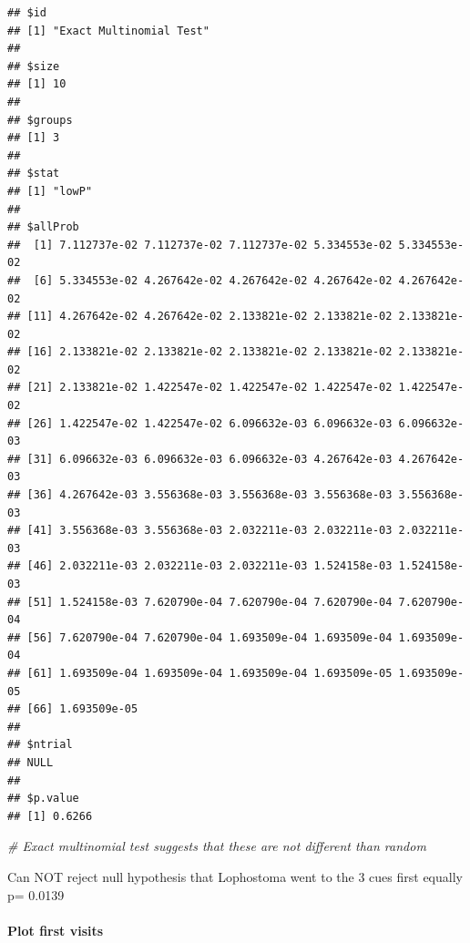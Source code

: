 \documentclass[]{article}
\newenvironment{Shaded}{\begin{snugshade}}{\end{snugshade}}
\newcommand{\CommentTok}[1]{\textcolor[rgb]{0.56,0.35,0.01}{\textit{{#1}}}}
\let\oldparagraph\paragraph
\renewcommand{\paragraph}[1]{\oldparagraph{#1}\mbox{}}
\begin{document}
\begin{verbatim}
## $id
## [1] "Exact Multinomial Test"
## 
## $size
## [1] 10
## 
## $groups
## [1] 3
## 
## $stat
## [1] "lowP"
## 
## $allProb
##  [1] 7.112737e-02 7.112737e-02 7.112737e-02 5.334553e-02 5.334553e-02
##  [6] 5.334553e-02 4.267642e-02 4.267642e-02 4.267642e-02 4.267642e-02
## [11] 4.267642e-02 4.267642e-02 2.133821e-02 2.133821e-02 2.133821e-02
## [16] 2.133821e-02 2.133821e-02 2.133821e-02 2.133821e-02 2.133821e-02
## [21] 2.133821e-02 1.422547e-02 1.422547e-02 1.422547e-02 1.422547e-02
## [26] 1.422547e-02 1.422547e-02 6.096632e-03 6.096632e-03 6.096632e-03
## [31] 6.096632e-03 6.096632e-03 6.096632e-03 4.267642e-03 4.267642e-03
## [36] 4.267642e-03 3.556368e-03 3.556368e-03 3.556368e-03 3.556368e-03
## [41] 3.556368e-03 3.556368e-03 2.032211e-03 2.032211e-03 2.032211e-03
## [46] 2.032211e-03 2.032211e-03 2.032211e-03 1.524158e-03 1.524158e-03
## [51] 1.524158e-03 7.620790e-04 7.620790e-04 7.620790e-04 7.620790e-04
## [56] 7.620790e-04 7.620790e-04 1.693509e-04 1.693509e-04 1.693509e-04
## [61] 1.693509e-04 1.693509e-04 1.693509e-04 1.693509e-05 1.693509e-05
## [66] 1.693509e-05
## 
## $ntrial
## NULL
## 
## $p.value
## [1] 0.6266
\end{verbatim}

\begin{Shaded}
\begin{Highlighting}[]
\CommentTok{# Exact multinomial test suggests that these are not different than random}
\end{Highlighting}
\end{Shaded}

Can NOT reject null hypothesis that Lophostoma went to the 3 cues first
equally p= 0.0139

\paragraph{Plot first visits}\label{plot-first-visits-2}
\end{document}
